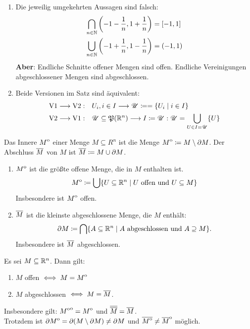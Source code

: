 \begin{bem}
    \begin{enumerate}
        \item Die jeweilig umgekehrten Aussagen sind falsch:
        \begin{align*}
            \bigcap_{n\in\mathbb{N}} \left(-1-\frac{1}{n},1+\frac{1}{n}\right) &= [-1,1]\\
            \bigcup_{n\in\mathbb{N}} \left(-1+\frac{1}{n},1-\frac{1}{n}\right) &= (-1,1)
        \end{align*}
        \textbf{Aber}: Endliche Schnitte offener Mengen sind offen. Endliche Vereinigungen abgeschlossener Mengen sind abgeschlossen.
        \item Beide Versionen im Satz sind äquivalent:
        \begin{align*}
            \mathrm{V1} \longrightarrow \mathrm{V2}:\quad& U_i, i\in I \longrightarrow \mathscr{U} \coloneqq = \{U_i \mid i\in I\}\\
            \mathrm{V2} \longrightarrow \mathrm{V1}:\quad& \mathscr{U}\subseteq \mathfrak{P}(\mathbb{R}^n) \longrightarrow I \coloneqq \mathscr{U}: \mathscr{U} = \bigcup_{U\in I=\mathscr{U}}\{U\}
        \end{align*}
    \end{enumerate}
\end{bem}
\begin{defn}
    Das Innere ${\kern0ptM}^{\mathrm{o}}$ einer Menge $M\subseteq R^n$ ist die Menge ${\kern0ptM}^{\mathrm{o}} \coloneqq M \setminus \partial M$. Der Abschluss ${\overline{\kern0ptM}}$ von $M$ ist ${\overline{\kern0ptM}}\coloneqq M\cup \partial M$.
\end{defn}
\begin{lemma}
    \begin{enumerate}
        \item ${\kern0ptM}^{\mathrm{o}}$ ist die größte offene Menge, die in $M$ enthalten ist.
        \[
            {\kern0ptM}^{\mathrm{o}} \coloneqq \bigcup \{U\subseteq \mathbb{R}^n \mid U\mathrm{\ offen\ und\ } U\subseteq M\}
        \]
        Insbesondere ist ${\kern0ptM}^{\mathrm{o}}$ offen.
        \item ${\overline{\kern0ptM}}$ ist die kleinste abgeschlossene Menge, die $M$ enthält:
        \[
            \partial{M} \coloneqq \bigcap \{A\subseteq \mathbb{R}^n \mid A\mathrm{\ abgeschlossen\ und\ } A\supseteq M\}.
        \]
        Insbesondere ist ${\overline{\kern0ptM}}$ abgeschlossen.
    \end{enumerate}
\end{lemma}
\begin{kor}
    Es sei $M\subseteq \mathbb{R}^n$. Dann gilt:
    \begin{enumerate}
        \item $M$ offen $\iff M = {\kern0ptM}^{\mathrm{o}}$
        \item $M$ abgeschlossen $\iff M = {\overline{\kern0ptM}}$.
    \end{enumerate}
\end{kor}
\begin{bem}
    Insbesondere gilt: ${\kern0pt{\kern0ptM}^{\mathrm{o}}}^{\mathrm{o}} = {\kern0ptM}^{\mathrm{o}}$ und ${\overline{\kern0pt{\overline{\kern0ptM}}}}={\overline{\kern0ptM}}$.\\
    Trotzdem ist $\partial{\kern0ptM}^{\mathrm{o}} = \partial(M\setminus\partial M) \neq \partial M$ und ${\overline{\kern0pt{\kern0ptM}^{\mathrm{o}}}} \neq {\kern0pt {\overline{\kern0ptM}}}^{\mathrm{o}}$ möglich.
\end{bem}